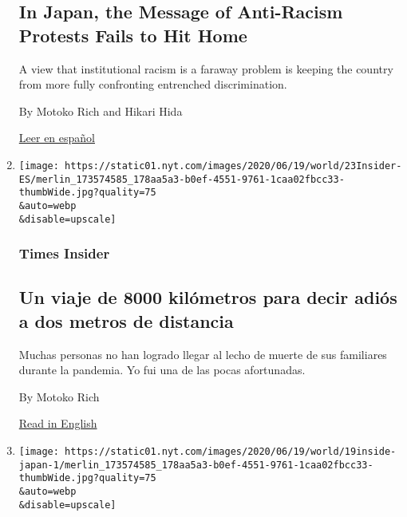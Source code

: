 \begin{enumerate}
  \hypertarget{in-japan-the-message-of-anti-racism-protests-fails-to-hit-home}{%
  \subsection{In Japan, the Message of Anti-Racism Protests Fails to Hit
  Home}\label{in-japan-the-message-of-anti-racism-protests-fails-to-hit-home}}

  A view that institutional racism is a faraway problem is keeping the
  country from more fully confronting entrenched discrimination.

  By Motoko Rich and Hikari Hida

  \href{https://www.nytimes.com/es/2020/07/06/espanol/mundo/racismo-japon-protestas.html}{Leer
  en español}
\item
  \href{/es/2020/06/22/espanol/despedida-coronavirus.html}{}

  \texttt{[image: https://static01.nyt.com/images/2020/06/19/world/23Insider-ES/merlin\_173574585\_178aa5a3-b0ef-4551-9761-1caa02fbcc33-thumbWide.jpg?quality=75\\\&auto=webp\\\&disable=upscale]}

  \hypertarget{times-insider}{%
  \subsubsection{Times Insider}\label{times-insider}}

  \hypertarget{un-viaje-de-8000-kiluxf3metros-para-decir-adiuxf3s-a-dos-metros-de-distancia}{%
  \subsection{Un viaje de 8000 kilómetros para decir adiós a dos metros
  de
  distancia}\label{un-viaje-de-8000-kiluxf3metros-para-decir-adiuxf3s-a-dos-metros-de-distancia}}

  Muchas personas no han logrado llegar al lecho de muerte de sus
  familiares durante la pandemia. Yo fui una de las pocas afortunadas.

  By Motoko Rich

  \href{https://www.nytimes.com/2020/06/19/reader-center/coronavirus-last-goodbyes.html}{Read
  in English}
\item
  \href{/2020/06/19/reader-center/coronavirus-last-goodbyes.html}{}

  \texttt{[image: https://static01.nyt.com/images/2020/06/19/world/19inside-japan-1/merlin\_173574585\_178aa5a3-b0ef-4551-9761-1caa02fbcc33-thumbWide.jpg?quality=75\\\&auto=webp\\\&disable=upscale]}


\end{enumerate}
